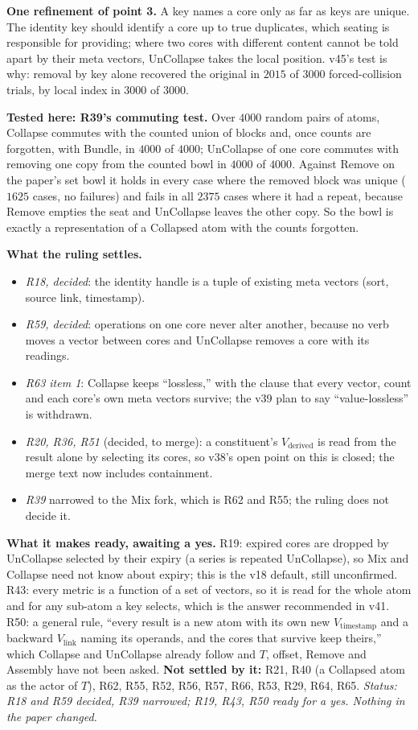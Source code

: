 \documentclass[11pt]{article}
\begin{document}
\textbf{One refinement of point 3.} A key names a core only as far as keys are unique. The identity key should identify a core up to true duplicates, which seating is responsible for providing; where two cores with different content cannot be told apart by their meta vectors, UnCollapse takes the
local position. v45's test is why: removal by key alone recovered the original in $2015$ of $3000$ forced-collision trials, by local index in $3000$ of $3000$.

\textbf{Tested here: R39's commuting test.} Over $4000$ random pairs of atoms, Collapse commutes with the counted union of blocks and, once counts are forgotten, with Bundle, in $4000$ of $4000$; UnCollapse of one core commutes with removing one copy from the counted bowl in $4000$ of $4000$. Against Remove on the paper's set
bowl it holds in every case where the removed block was unique ($1625$ cases, no failures) and fails in all $2375$ cases where it had a repeat, because Remove empties the seat and UnCollapse leaves the other copy. So the bowl is exactly a representation of a Collapsed atom with the counts forgotten.

\textbf{What the ruling settles.}
\begin{itemize}
\item \emph{R18, decided}: the identity handle is a tuple of existing meta vectors (sort, source link, timestamp).
\item \emph{R59, decided}: operations on one core never alter another, because no verb moves a vector between cores and UnCollapse removes a core with its readings.
\item \emph{R63 item 1}: Collapse keeps ``lossless,'' with the clause that every vector, count and each core's own meta vectors survive; the v39 plan to say ``value-lossless'' is withdrawn.
\item \emph{R20, R36, R51} (decided, to merge): a constituent's $V_{\text{derived}}$ is read from the result alone by selecting its cores, so v38's open point on this is closed; the merge text now includes containment.
\item \emph{R39} narrowed to the Mix fork, which is R62 and R55; the ruling does not decide it.
\end{itemize}
\textbf{What it makes ready, awaiting a yes.} R19: expired cores are dropped by UnCollapse selected by their expiry (a series is repeated UnCollapse), so Mix and Collapse need not know about expiry; this is the v18 default, still unconfirmed.
R43: every metric is a function of a set of vectors, so it is read for the whole atom and for any sub-atom a key selects, which is the answer recommended in v41. R50: a general rule, ``every result is a new atom with its own new $V_{\text{timestamp}}$ and a backward
$V_{\text{link}}$ naming its operands, and the cores that survive keep theirs,'' which Collapse and UnCollapse already follow and $T$, offset, Remove and Assembly have not been asked.
\textbf{Not settled by it:} R21, R40 (a Collapsed atom as the actor of $T$), R62, R55, R52, R56, R57, R66, R53, R29, R64, R65.
\emph{Status: R18 and R59 decided, R39 narrowed; R19, R43, R50 ready for a yes. Nothing in the paper changed.}
\end{document}
